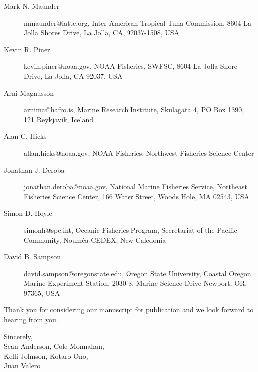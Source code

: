 \documentclass[letterpaper,11pt]{letter}
\begin{document}
\begin{letter}{}
\begin{description}
  \item [Mark N. Maunder] mmaunder@iattc.org, Inter-American Tropical Tuna
    Commission, 8604 La Jolla Shores Drive, La Jolla, CA, 92037-1508, USA
  \item [Kevin R. Piner] kevin.piner@noaa.gov, NOAA Fisheries, SWFSC, 8604 La
    Jolla Shore Drive, La Jolla, CA 92037, USA
  \item [Arni Magnusson] arnima@hafro.is, Marine Research Institute, Skulagata
    4, PO Box 1390, 121 Reykjavik, Iceland
  \item [Alan C. Hicks] allan.hicks@noaa.gov, NOAA Fisheries, Northwest
    Fisheries Science Center
  \item [Jonathan J. Deroba] jonathan.deroba@noaa.gov, National Marine Fisheries
    Service, Northeast Fisheries Science Center, 166 Water Street, Woods Hole,
    MA 02543, USA
  \item [Simon D. Hoyle] simonh@spc.int, Oceanic Fisheries Program, Secretariat
    of the Pacific Community, Nouméa CEDEX, New Caledonia
  \item [David B. Sampson] david.sampson@oregonstate.edu, Oregon State
    University, Coastal Oregon Marine Experiment Station, 2030 S. Marine
    Science Drive Newport, OR, 97365, USA
\end{description}

Thank you for considering our manuscript for publication and we look forward to
hearing from you.


\bigskip
\closing{Sincerely,\\
Sean Anderson, Cole Monnahan,\\Kelli Johnson, Kotaro Ono,\\Juan Valero}

\end{letter}
\end{document}
